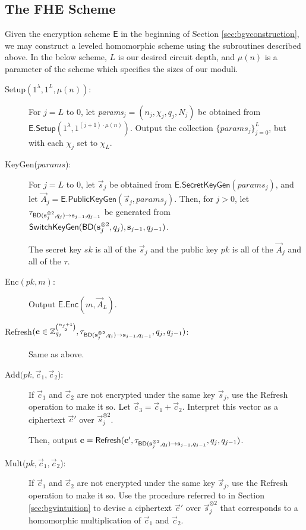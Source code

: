    \subsection{The FHE Scheme} \label{sec:actualbgv}
    Given the encryption scheme $\textsf{E}$ in the beginning of Section \ref{sec:bgvconstruction}, we may construct a leveled homomorphic scheme using the subroutines described above. In the below  scheme, $L$ is our desired circuit depth, and $\mu(n)$ is a parameter of the scheme which specifies the sizes of our moduli.
    \begin{description}
        \item[Setup$(1^\lambda, 1^L, \mu(n))$:] For $j = L$ to $0$, let \textit{params}$_j = (n_j, \chi_j, q_j, N_j)$ be obtained from $\textsf{E.Setup}(1^\lambda, 1^{(j + 1)\cdot \mu(n)})$. Output the collection $\{params_j\}_{j = 0}^L$, but with each $\chi_j$ set to $\chi_L$.

        \item[KeyGen($params$):] For $j = L$ to $0$, let $\vec{s}_j$ be obtained from $\textsf{E.SecretKeyGen}(params_j)$, and let $\vec{A}_j = \textsf{E.PublicKeyGen}(\vec{s}_j, params_j)$. Then, for $j > 0$, let $\tau_{{\sf BD}(\vec{s}_j^{\otimes 2}, q_j) \to \vec{s}_{j-1}, q_{j-1}}$ be generated from ${\sf SwitchKeyGen}({\sf BD}(\vec{s}_j^{\otimes 2}, q_j), \vec{s}_{j-1}, q_{j-1})$.

        The secret key $sk$ is all of the $\vec{s}_j$ and the public key $pk$ is all of the $\vec{A}_j$ and all of the $\tau$.

        \item[Enc$(pk, m)$:] Output $\textsf{E.Enc}(m, \vec{A}_L)$.

        \item[Refresh$(\vec{c} \in \Z_{q_j}^{{n_j+1}\choose{2}}, \tau_{{\sf BD}(\vec{s}_j^{\otimes 2}, q_j) \to \vec{s}_{j-1}, q_{j-1}}, q_j, q_{j-1})$:] Same as above.

        \item[Add$(pk, \vec{c}_1, \vec{c}_2$):] If $\vec{c}_1$ and $\vec{c}_2$ are not encrypted under the same key $\vec{s}_j$, use the \textsf{Refresh} operation to make it so. Let $\vec{c}_3 = \vec{c}_1 + \vec{c}_2$. Interpret this vector as a ciphertext $\vec{c}'$ over $\vec{s}_j^{\otimes 2}$.

        Then, output $\vec{c} = {\sf Refresh}(\vec{c}', \tau_{{\sf BD}(\vec{s}_j^{\otimes 2}, q_j) \to \vec{s}_{j-1}, q_{j-1}}, q_j, q_{j-1})$.

        \item[Mult$(pk, \vec{c}_1, \vec{c}_2$):] If $\vec{c}_1$ and $\vec{c}_2$ are not encrypted under the same key $\vec{s}_j$, use the \textsf{Refresh} operation to make it so. Use the procedure referred to in Section \ref{sec:bgvintuition} to devise a ciphertext $\vec{c}'$ over $\vec{s}_j^{\otimes 2}$ that corresponds to a homomorphic multiplication of $\vec{c}_1$ and $\vec{c}_2$.


\end{description}
